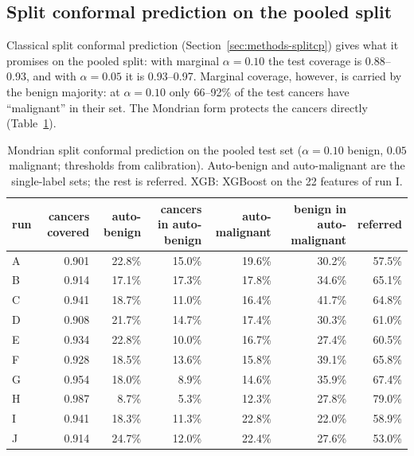 \subsection{Split conformal prediction on the pooled split}
\label{sec:results-splitcp}

Classical split conformal prediction (Section~\ref{sec:methods-splitcp}) gives what it promises on
the pooled split: with marginal $\alpha = 0.10$ the test coverage is 0.88--0.93, and with
$\alpha = 0.05$ it is 0.93--0.97. Marginal coverage, however, is carried by the benign majority:
at $\alpha = 0.10$ only 66--92\% of the test cancers have ``malignant'' in their set. The Mondrian
form protects the cancers directly (Table~\ref{tab:results-splitcp}).

\begin{table}[ht]
  \centering
  \small
  \caption{Mondrian split conformal prediction on the pooled test set ($\alpha = 0.10$ benign,
           $0.05$ malignant; thresholds from calibration). Auto-benign and auto-malignant are
           the single-label sets; the rest is referred. XGB: XGBoost on the 22 features of run I.}
  \label{tab:results-splitcp}
  \begin{tabular}{lrrrrrr}
    \toprule
    run & \multicolumn{1}{p{1.6cm}}{\raggedleft cancers covered}
        & \multicolumn{1}{p{1.3cm}}{\raggedleft auto-benign}
        & \multicolumn{1}{p{1.7cm}}{\raggedleft cancers in auto-benign}
        & \multicolumn{1}{p{1.5cm}}{\raggedleft auto-malignant}
        & \multicolumn{1}{p{1.7cm}}{\raggedleft benign in auto-malignant}
        & referred \\
    \midrule
    A & 0.901 & 22.8\% & 15.0\% & 19.6\% & 30.2\% & 57.5\% \\
    B & 0.914 & 17.1\% & 17.3\% & 17.8\% & 34.6\% & 65.1\% \\
    C & 0.941 & 18.7\% & 11.0\% & 16.4\% & 41.7\% & 64.8\% \\
    D & 0.908 & 21.7\% & 14.7\% & 17.4\% & 30.3\% & 61.0\% \\
    E & 0.934 & 22.8\% & 10.0\% & 16.7\% & 27.4\% & 60.5\% \\
    F & 0.928 & 18.5\% & 13.6\% & 15.8\% & 39.1\% & 65.8\% \\
    G & 0.954 & 18.0\% &  8.9\% & 14.6\% & 35.9\% & 67.4\% \\
    H & 0.987 &  8.7\% &  5.3\% & 12.3\% & 27.8\% & 79.0\% \\
    I & 0.941 & 18.3\% & 11.3\% & 22.8\% & 22.0\% & 58.9\% \\
    J & 0.914 & 24.7\% & 12.0\% & 22.4\% & 27.6\% & 53.0\% \\

\end{tabular}
\end{table}
